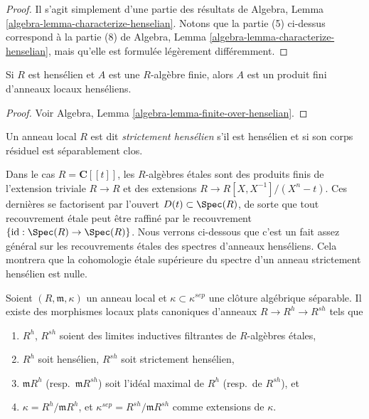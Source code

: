 \begin{proof}
Il s'agit simplement d'une partie des r\'esultats de
Algebra, Lemma \ref{algebra-lemma-characterize-henselian}.
Notons que la partie (5) ci-dessus correspond \`a la partie (8) de
Algebra, Lemma \ref{algebra-lemma-characterize-henselian},
mais qu'elle est formul\'ee l\'eg\`erement diff\'eremment.
\end{proof}

\begin{lemma}
\label{lemma-finite-over-henselian}
Si $R$ est hens\'elien et $A$ est une $R$-alg\`ebre finie, alors $A$ est un produit
fini d'anneaux locaux hens\'eliens.
\end{lemma}

\begin{proof}
Voir
Algebra, Lemma \ref{algebra-lemma-finite-over-henselian}.
\end{proof}

\begin{definition}
\label{definition-strictly-henselian}
Un anneau local $R$ est dit {\it strictement hens\'elien} s'il est hens\'elien et si son
corps r\'esiduel est s\'eparablement clos.
\end{definition}

\begin{example}
\label{example-powerseries}
Dans le cas $R = \mathbf{C}[[t]]$, les $R$-alg\`ebres \'etales sont des produits finis
de l'extension triviale $R \to R$ et des extensions
$R \to R[X, X^{-1}]/(X^n-t)$.
Ces derni\`eres se factorisent par l'ouvert $D(t) \subset \Spec(R)$, de sorte que tout
recouvrement \'etale peut \^etre raffin\'e par le recouvrement
$\{\text{id} : \Spec(R) \to \Spec(R)\}$. Nous verrons ci-dessous que
c'est un fait assez g\'en\'eral sur les recouvrements \'etales des spectres d'anneaux
hens\'eliens. Cela montrera que la cohomologie \'etale sup\'erieure du spectre d'un anneau
strictement hens\'elien est nulle.
\end{example}

\begin{theorem}
\label{theorem-henselization}
Soient $(R, \mathfrak m, \kappa)$ un anneau local et
$\kappa\subset\kappa^{sep}$ une cl\^oture alg\'ebrique s\'eparable.
Il existe des morphismes locaux plats canoniques d'anneaux $R \to R^h \to R^{sh}$ tels que
\begin{enumerate}
\item $R^h$, $R^{sh}$ soient des limites inductives filtrantes de $R$-alg\`ebres \'etales,
\item $R^h$ soit hens\'elien, $R^{sh}$ soit strictement hens\'elien,
\item $\mathfrak m R^h$ (resp.\ $\mathfrak m R^{sh}$) soit
l'id\'eal maximal de $R^h$ (resp.\ de $R^{sh}$), et
\item $\kappa = R^h/\mathfrak m R^h$, et
$\kappa^{sep} = R^{sh}/\mathfrak m R^{sh}$ comme extensions de $\kappa$.
\end{enumerate}
\end{theorem}

